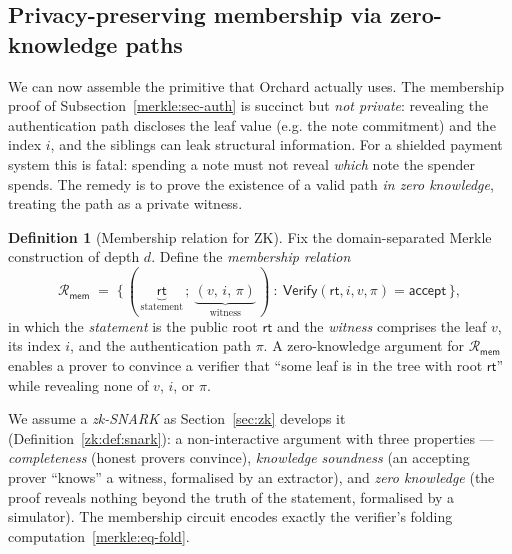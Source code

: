 \documentclass[11pt,a4paper]{article}
\theoremstyle{definition}
\newtheorem{definition}[theorem]{Definition}
\theoremstyle{remark}
\begin{document}
\subsection{Privacy-preserving membership via zero-knowledge paths}\label{merkle:sec-zk}

We can now assemble the primitive that Orchard actually uses. The membership proof of Subsection~\ref{merkle:sec-auth} is succinct but \emph{not private}: revealing the authentication path discloses the leaf value (e.g. the note commitment) and the index \(i\), and the siblings can leak structural information. For a shielded payment system this is fatal: spending a note must not reveal \emph{which} note the spender spends. The remedy is to prove the existence of a valid path \emph{in zero knowledge}, treating the path as a private witness.

\begin{definition}[Membership relation for ZK]\label{merkle:def-zk-relation}
Fix the domain-separated Merkle construction of depth \(d\). Define the \emph{membership relation}
\[
\mathcal{R}_{\mathsf{mem}} \;=\; \bigl\{\, (\,\underbrace{\mathsf{rt}}_{\text{statement}}\,;\ \underbrace{(v,\, i,\, \pi)}_{\text{witness}}\,) \ :\ \mathsf{Verify}(\mathsf{rt}, i, v, \pi) = \mathsf{accept} \,\bigr\},
\]
in which the \emph{statement} is the public root \(\mathsf{rt}\) and the \emph{witness} comprises the leaf \(v\), its index \(i\), and the authentication path \(\pi\). A zero-knowledge argument for \(\mathcal{R}_{\mathsf{mem}}\) enables a prover to convince a verifier that ``some leaf is in the tree with root \(\mathsf{rt}\)'' while revealing none of \(v\), \(i\), or \(\pi\).
\end{definition}

We assume a \emph{zk-SNARK} as Section~\ref{sec:zk} develops it (Definition~\ref{zk:def:snark}): a non-interactive argument with three properties --- \emph{completeness} (honest provers convince), \emph{knowledge soundness} (an accepting prover ``knows'' a witness, formalised by an extractor), and \emph{zero knowledge} (the proof reveals nothing beyond the truth of the statement, formalised by a simulator). The membership circuit encodes exactly the verifier's folding computation~\eqref{merkle:eq-fold}.
\end{document}
